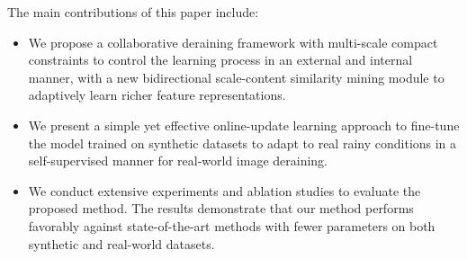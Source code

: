 \documentclass[letterpaper]{article} %
\newcommand{\JS} [1] {\textcolor{red}{[JS: #1]}}
\begin{document}
The main contributions of this paper include:
\begin{itemize}
\item We propose a collaborative deraining framework with multi-scale compact constraints to control the learning process in an external and internal manner, with a new bidirectional scale-content similarity mining module to adaptively learn richer feature representations.

\item We present a simple yet effective online-update learning approach to fine-tune the model trained on synthetic datasets to adapt to real rainy conditions in a self-supervised manner for real-world image deraining.

\item We conduct extensive experiments and ablation studies to evaluate the proposed method. The results demonstrate that our method performs favorably against state-of-the-art methods with fewer parameters on both synthetic and real-world datasets.
\end{itemize}



%
%
\end{document}
